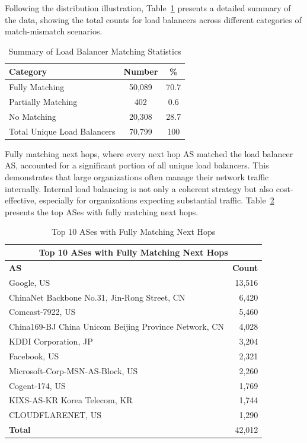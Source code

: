 \documentclass[12pt]{cwru_thesis}
\begin{document}
Following the distribution illustration, Table~\ref{tab:summary_data} presents a detailed summary of the data, showing the total counts for load balancers across different categories of match-mismatch scenarios.\\

\begin{table}[h!]
\centering
\begin{tabular}{|l|c|c|}
\hline
\textbf{Category} & \textbf{Number} &\textbf{\%} \\
\hline
Fully Matching & 50,089 & 70.7 \\
Partially Matching & 402 & 0.6 \\
No Matching & 20,308 & 28.7 \\
\hline
Total Unique Load Balancers & 70,799& 100 \\
\hline
\end{tabular}
\caption{Summary of Load Balancer Matching Statistics}
\label{tab:summary_data}
\end{table}


Fully matching next hops, where every next hop AS matched the load balancer AS, accounted for a significant portion of all unique load balancers. This demonstrates that large organizations often manage their network traffic internally. Internal load balancing is not only a coherent strategy but also cost-effective, especially for organizations expecting substantial traffic. 
Table~\ref{tab:fully_matching} presents the top ASes with fully matching next hops.

\begin{table}[h!]
    \centering
    \begin{tabular}{|l|r|}
        \hline
        \multicolumn{2}{|c|}{\textbf{Top 10 ASes with Fully Matching Next Hops}} \\
        \hline
        \textbf{AS} & \textbf{Count} \\
        \hline
        Google, US & 13,516 \\
        ChinaNet Backbone No.31, Jin-Rong Street, CN & 6,420 \\
        Comcast-7922, US & 5,460 \\
        China169-BJ China Unicom Beijing Province Network, CN & 4,028 \\
        KDDI Corporation, JP & 3,204 \\
        Facebook, US & 2,321 \\
        Microsoft-Corp-MSN-AS-Block, US & 2,260 \\
        Cogent-174, US & 1,769 \\
        KIXS-AS-KR Korea Telecom, KR & 1,744 \\
        CLOUDFLARENET, US  & 1,290 \\
        \hline
        \textbf{Total} & 42,012 \\
        \hline
    \end{tabular}
    \caption{Top 10 ASes with Fully Matching Next Hops}
    \label{tab:fully_matching}
\end{table}
\end{document}
